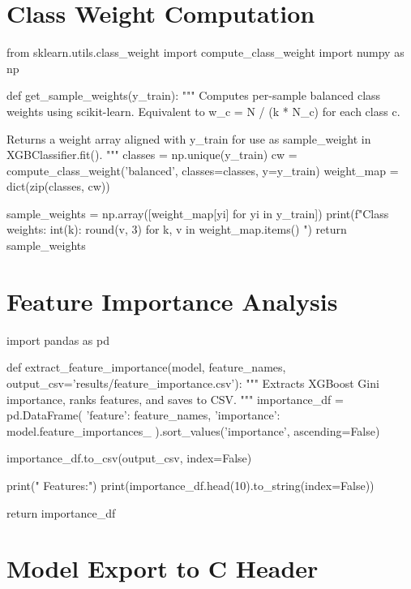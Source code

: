 \section{Class Weight Computation}
\label{app:class_weights}

\begin{pycode}
from sklearn.utils.class_weight import compute_class_weight
import numpy as np

def get_sample_weights(y_train):
    """
    Computes per-sample balanced class weights using scikit-learn.
    Equivalent to w_c = N / (k * N_c) for each class c.

    Returns a weight array aligned with y_train for use as
    sample_weight in XGBClassifier.fit().
    """
    classes = np.unique(y_train)
    cw = compute_class_weight('balanced',
                               classes=classes, y=y_train)
    weight_map = dict(zip(classes, cw))

    sample_weights = np.array([weight_map[yi] for yi in y_train])
    print(f"Class weights: { {int(k): round(v, 3)
                               for k, v in weight_map.items()} }")
    return sample_weights
\end{pycode}


\section{Feature Importance Analysis}
\label{app:feature_importance}

\begin{pycode}
import pandas as pd

def extract_feature_importance(model, feature_names,
                                output_csv='results/feature_importance.csv'):
    """
    Extracts XGBoost Gini importance, ranks features, and saves to CSV.
    """
    importance_df = pd.DataFrame({
        'feature':    feature_names,
        'importance': model.feature_importances_
    }).sort_values('importance', ascending=False)

    importance_df.to_csv(output_csv, index=False)

    print(" Features:")
    print(importance_df.head(10).to_string(index=False))

    return importance_df
\end{pycode}


\section{Model Export to C Header}
\label{app:model_export}


